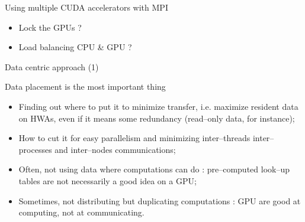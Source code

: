 \documentclass{beamer}
\newcounter{gp}
\begin{document}
\begin{frame}{Using multiple CUDA accelerators with MPI}
\begin{itemize}
\begin{minipage}[t]{60mm}
\begin{itemize}
      \item Lock the GPUs  ?
      \item Load balancing CPU \& GPU ?
      \end{itemize}
    \end{minipage}
    \begin{minipage}{35mm}
    \end{minipage}
  \end{itemize}
\end{frame}

\begin{frame}{Data centric approach (1)}

  Data placement is the most important thing 
  \begin{itemize}
  \item Finding out where to put it to minimize transfer, i.e. maximize
    resident data on HWAs, even if it means some redundancy (read--only data,
    for instance);
  \item How to cut it for easy parallelism and minimizing inter--threads 
    inter--processes and inter--nodes communications;
  \item Often, not using data where computations can do : pre--computed 
    look--up tables are not necessarily a good idea on a GPU;
  \item Sometimes, not distributing but duplicating computations : GPU are
    good at computing, not at communicating.    
  \end{itemize}
\end{frame}
\end{document}
